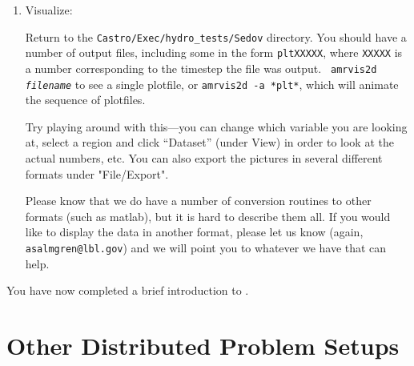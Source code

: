 \begin{enumerate}
\item Visualize:

  Return to the {\tt Castro/Exec/hydro\_tests/Sedov} directory.  You should
  have a number of output files, including some in the form {\tt *pltXXXXX},
  where {\tt XXXXX} is a number corresponding to the timestep the file
  was output.  {\tt
    amrvis2d {\em filename}} to see a single plotfile, or {\tt amrvis2d -a
  *plt*}, which will animate the sequence of plotfiles.

  Try playing
  around with this---you can change which variable you are
  looking at, select a region and click ``Dataset'' (under View)
  in order to look at the actual numbers, etc. You can also export the
  pictures in several different formats under "File/Export".

Please know that we do have a number of conversion routines to other
formats (such as matlab), but it is hard to describe them all. If you
would like to display the data in another format, please let us know
(again, {\tt asalmgren@lbl.gov}) and we will point you to whatever we have
that can help.

\end{enumerate}

You have now completed a brief introduction to \castro. 


\section{Other Distributed Problem Setups}

